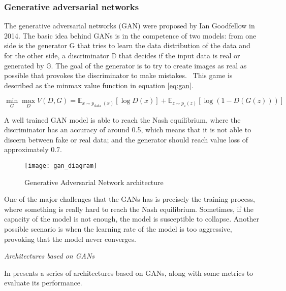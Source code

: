 \subsubsection{Generative adversarial networks}

The generative adversarial networks (GAN) were proposed by Ian Goodfellow \cite{Goodfellow2014} in 2014. The basic idea behind GANs is in the competence of two models: from one side is the generator G that tries to learn the data distribution of the data and for the other side, a discriminator \begin{math}\mathbb{D}\end{math} that decides if the input data is real or generated by \begin{math}\mathbb{G}\end{math}. The goal of the generator is to try to create images as real as possible that provokes the discriminator to make mistakes.  This game is described as the minmax value function in equation \ref{eq:gan}.

\begin{equation}
 \min _{G} \max _{D} V(D, G)=\mathbb{E}_{x \sim p_{\text {data }}(x)}[\log D(x)]+\mathbb{E}_{z \sim p_{z}(z)}[\log (1-D(G(z)))]
 \label{eq:gan}
\end{equation}

A well trained GAN model is able to reach the Nash equilibrium, where the discriminator has an accuracy of around 0.5, which means that it is not able to discern between fake or real data; and the generator should reach value loss of approximately 0.7.

\begin{figure}[htb]
  \centering
  \texttt{[image: gan\_diagram]}
  \caption[Generative Adversarial Network architecture]{Generative Adversarial Network architecture}
  \label{fig:gan}
\end{figure}

One of the major challenges that the GANs has is precisely the training process, where something is really hard to reach the Nash equilibrium. Sometimes, if the capacity of the model is not enough, the model is susceptible to collapse. Another possible scenario is when the learning rate of the model is too aggressive, provoking that the model never converges.

\textit{Architectures based on GANs}

In \cite{Pan2019} presents a series of architectures based on GANs, along with some metrics to evaluate its performance.


